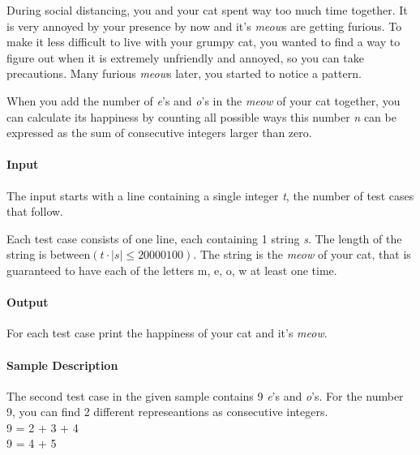 




During social distancing, you and your cat spent way too much time together. It is very annoyed by your presence by now and it's \textit{meow}s are getting furious.
To make it less difficult to live with your grumpy cat, you wanted to find a way to figure out when it is extremely unfriendly and annoyed, so you can take precautions.
Many furious \textit{meow}s later, you started to notice a pattern.


When you add the number of \textit{e}'s and \textit{o}'s in the \textit{meow} of your cat together, you can calculate its happiness by counting all possible ways this number \textit{n} can be expressed as the sum of consecutive integers larger than zero.

\paragraph*{Input}

The input starts with a line containing a single integer \textit{t}, the number of test cases that follow.

Each test case consists of one line, each containing 1 string \textit{s}. The length of the string is between\begin{math}(t\cdot |s| \leq 20000100)\end{math}.
The string is the \textit{meow} of your cat, that is guaranteed to have each of the letters m, e, o, w at least one time.
\paragraph*{Output}

For each test case print the happiness of your cat and it's \textit{meow}.
\begin{samples}
\end{samples}

\paragraph*{Sample Description}
The second test case in the given sample contains 9 \textit{e}'s and \textit{o}'s. For the number 9, you can find 2 different represeantions as consecutive integers.\\
9 = 2 + 3 + 4\\
9 = 4 + 5


